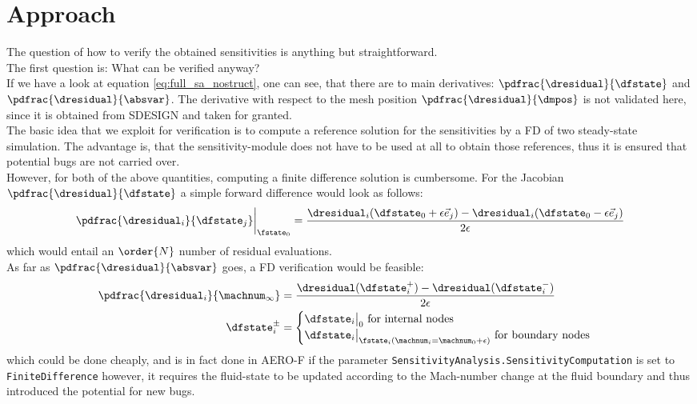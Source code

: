 \documentclass[../main.tex]{subfiles}
\begin{document}
\section{Approach}\label{sec:verification_approach}
The question of how to verify the obtained sensitivities is anything but straightforward.\\
The first question is: What can be verified anyway?\\
If we have a look at equation \eqref{eq:full_sa_nostruct}, one can see, that there are to main derivatives: $\pdfrac{\dresidual}{\dfstate}$ and $\pdfrac{\dresidual}{\absvar}$. The derivative with respect to the mesh position $\pdfrac{\dresidual}{\dmpos}$ is not validated here, since it is obtained from SDESIGN and taken for granted.\\
The basic idea that we exploit for verification is to compute a reference solution for the sensitivities by a \ac{FD} of two steady-state simulation. The advantage is, that the sensitivity-module does not have to be used at all to obtain those references, thus it is ensured that potential bugs are not carried over.\\
However, for both of the above quantities, computing a finite difference solution is cumbersome. For the Jacobian $\pdfrac{\dresidual}{\dfstate}$ a simple forward difference would look as follows:
\begin{align}
\pdfrac{\dresidual_i}{\dfstate_j}\bigg\rvert_{\fstate_0}=\frac{\dresidual_i(\dfstate_0+\epsilon\vec{e}_j)-\dresidual_i(\dfstate_0-\epsilon\vec{e}_j)}{2\epsilon}
\end{align}
which would entail an $\order{N}$ number of residual evaluations.\\
As far as $\pdfrac{\dresidual}{\absvar}$ goes, a \ac{FD} verification would be feasible:
\begin{align}
\pdfrac{\dresidual_i}{\machnum_{\infty}}&=\frac{\dresidual(\dfstate_i^{+})-\dresidual(\dfstate_i^{-})}{2\epsilon} \nonumber \\
\dfstate_i^{\pm} &=
\begin{cases}
\dfstate_i\big\rvert_{0}\text{   for internal nodes}\\
\dfstate_i\big\rvert_{\fstate_i(\machnum_i=\machnum_0+\epsilon)}\text{   for boundary nodes}
\end{cases}
\end{align}
which could be done cheaply, and is in fact done in AERO-F if the parameter \texttt{SensitivityAnalysis.SensitivityComputation} is set to \texttt{FiniteDifference} however, it requires the fluid-state to be updated according to the Mach-number change at the fluid boundary and thus introduced the potential for new bugs.\\
\end{document}
